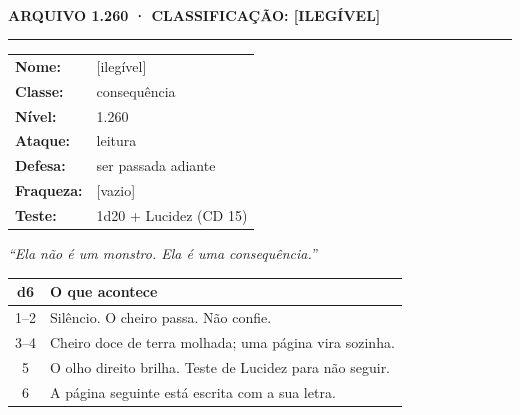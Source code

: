 \clearpage
\thispagestyle{empty}
\begin{rpgdark}
\centering
{}\\[0.25em]
{\scshape\bfseries\small ARQUIVO 1.260 · CLASSIFICAÇÃO: [ILEGÍVEL]}\\[0.3em]
{\color{rpggold}\rule{0.55\textwidth}{0.6pt}}
\end{rpgdark}

\vspace{0.5em}
\begin{rpgdark}[FICHA]
\small
\renewcommand{\arraystretch}{1.3}
\begin{tabularx}{\textwidth}{@{}lX@{}}
\textbf{Nome:} & [ilegível] \\
\textbf{Classe:} & consequência \\
\textbf{Nível:} & 1.260 \\
\textbf{Ataque:} & leitura \\
\textbf{Defesa:} & ser passada adiante \\
\textbf{Fraqueza:} & [vazio] \\
\textbf{Teste:} & 1d20 + Lucidez (CD 15) \\
\end{tabularx}
\end{rpgdark}

\vspace{0.5em}
\begin{rpgbox}
\centering
\itshape ``Ela não é um monstro. Ela é uma consequência.''
\end{rpgbox}

\vspace{0.5em}
\begin{rpgbox}
\small
\begin{tabularx}{\textwidth}{@{}cX@{}}
\toprule
\textbf{d6} & \textbf{O que acontece} \\
\midrule
1--2 & Silêncio. O cheiro passa. Não confie. \\
3--4 & Cheiro doce de terra molhada; uma página vira sozinha. \\
5 & O olho direito brilha. Teste de Lucidez para não seguir. \\
6 & A página seguinte está escrita com a sua letra. \\
\bottomrule
\end{tabularx}
\end{rpgbox}

\vspace{0.5em}
\clearpage
